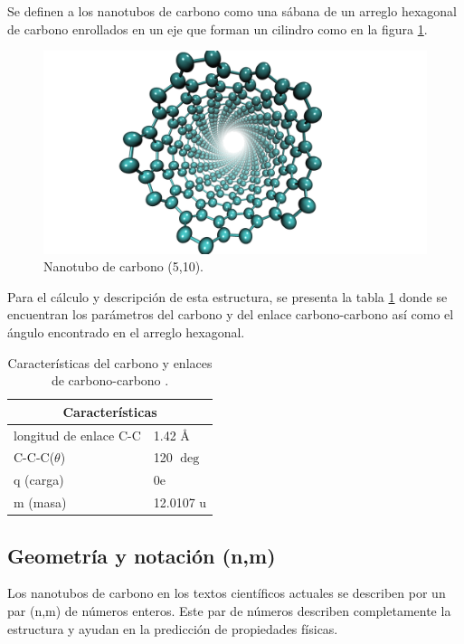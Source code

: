 Se definen a los nanotubos de carbono como una sábana de un arreglo hexagonal de carbono enrollados en un eje que forman un cilindro como en la figura \ref{fig:CNTejemplo}. 

\begin{figure}[!h]
    \centering
    \includegraphics[width=.7\textwidth,keepaspectratio=true]{CNT/CNTejemplo.png}
    \caption{Nanotubo de carbono (5,10).}
    \label{fig:CNTejemplo}
\end{figure}

Para el cálculo y descripción de esta estructura, se presenta la tabla \ref{tab:carbono} donde se encuentran los parámetros del carbono y del enlace carbono-carbono así como el ángulo encontrado en el arreglo hexagonal.

\begin{table}[h!]
    \centering
    \begin{tabular}{ |p{4cm}|p{2cm}|  }
    \hline
    \multicolumn{2}{|c|}{Características} \\
    \hline
    longitud de enlace C-C   & 1.42 \AA \\
    \hline
    C-C-C($\theta$)   & 120 $\deg$ \\
    \hline
    q (carga) & 0e \\
    \hline
    m (masa)   & 12.0107 u \\
    \hline
    \end{tabular}
    \caption{Características del carbono y enlaces de carbono-carbono \cite{Melendez2016}.}
    \label{tab:carbono}
\end{table}

\subsection{Geometría y notación (n,m)}

Los nanotubos de carbono en los textos científicos actuales se describen por un par (n,m) de números enteros. Este par de números describen completamente la estructura y ayudan en la predicción de propiedades físicas.\\

